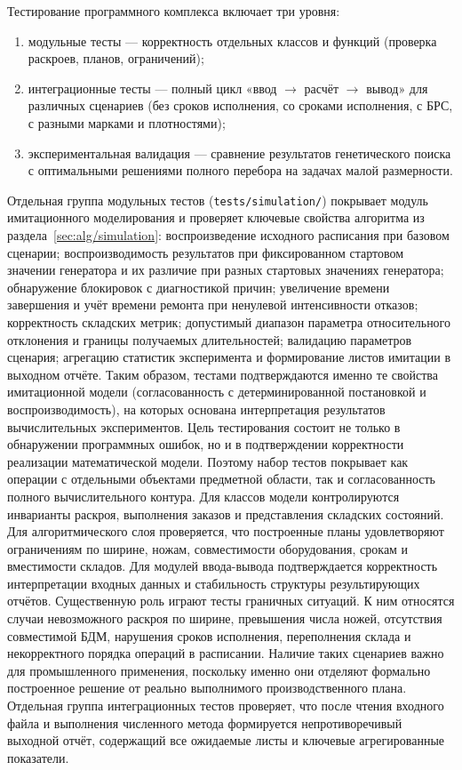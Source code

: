 Тестирование программного комплекса включает три уровня:
\begin{enumerate}
    \item модульные тесты --- корректность отдельных классов и функций (проверка раскроев, планов, ограничений);
    \item интеграционные тесты --- полный цикл «ввод $\rightarrow$ расчёт $\rightarrow$ вывод» для различных сценариев (без сроков исполнения, со сроками исполнения, с БРС, с разными марками и плотностями);
    \item экспериментальная валидация --- сравнение результатов генетического поиска с оптимальными решениями полного перебора на задачах малой размерности.
\end{enumerate}
Отдельная группа модульных тестов (\texttt{tests/simulation/}) покрывает модуль имитационного моделирования и проверяет ключевые свойства алгоритма из раздела~\ref{sec:alg/simulation}: воспроизведение исходного расписания при базовом сценарии; воспроизводимость результатов при фиксированном стартовом значении генератора и их различие при разных стартовых значениях генератора; обнаружение блокировок с диагностикой причин; увеличение времени завершения и учёт времени ремонта при ненулевой интенсивности отказов; корректность складских метрик; допустимый диапазон параметра относительного отклонения и границы получаемых длительностей; валидацию параметров сценария; агрегацию статистик эксперимента и формирование листов имитации в выходном отчёте. Таким образом, тестами подтверждаются именно те свойства имитационной модели (согласованность с детерминированной постановкой и воспроизводимость), на которых основана интерпретация результатов вычислительных экспериментов.
Цель тестирования состоит не только в обнаружении программных ошибок, но и в подтверждении корректности реализации математической модели. Поэтому набор тестов покрывает как операции с отдельными объектами предметной области, так и согласованность полного вычислительного контура. Для классов модели контролируются инварианты раскроя, выполнения заказов и представления складских состояний. Для алгоритмического слоя проверяется, что построенные планы удовлетворяют ограничениям по ширине, ножам, совместимости оборудования, срокам и вместимости складов. Для модулей ввода-вывода подтверждается корректность интерпретации входных данных и стабильность структуры результирующих отчётов.
Существенную роль играют тесты граничных ситуаций. К ним относятся случаи невозможного раскроя по ширине, превышения числа ножей, отсутствия совместимой БДМ, нарушения сроков исполнения, переполнения склада и некорректного порядка операций в расписании. Наличие таких сценариев важно для промышленного применения, поскольку именно они отделяют формально построенное решение от реально выполнимого производственного плана. Отдельная группа интеграционных тестов проверяет, что после чтения входного файла и выполнения численного метода формируется непротиворечивый выходной отчёт, содержащий все ожидаемые листы и ключевые агрегированные показатели.

